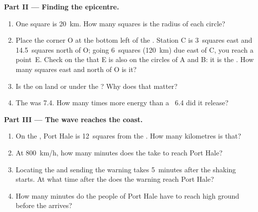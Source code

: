 \begin{problem}
\medskip
\noindent\textbf{Part II --- Finding the epicentre.}\par\nopagebreak
\begin{enumerate}[resume, beginpenalty=10000]
  \item One square is \qty{20}{km}. How many squares is the radius of
        each circle?
  \item Place the corner O at the bottom left of the . Station C is
        3~squares east and 14.5~squares north of O; going 6~squares
        (\qty{120}{km}) due east of C, you reach a point~E. Check on the
         that E is also on the circles of A and B: it is the .
        How many squares east and north of O is it?
  \item Is the  on land or under the ? Why does that matter?
  \item The  was 7.4. How many times more energy than a
        ~6.4  did it release?
\end{enumerate}

\medskip
\noindent\textbf{Part III --- The wave reaches the coast.}\par\nopagebreak
\begin{enumerate}[resume, beginpenalty=10000]
  \item On the , Port Hale is 12~squares from the . How many
        kilometres is that?
  \item At \qty{800}{km/h}, how many minutes does the  take to
        reach Port Hale?
  \item Locating the  and sending the warning takes
        5~minutes after the shaking starts. At what time after the
         does the warning reach Port Hale?
  \item How many minutes do the people of Port Hale have to reach high
        ground before the  arrives?
\end{enumerate}
\end{problem}

